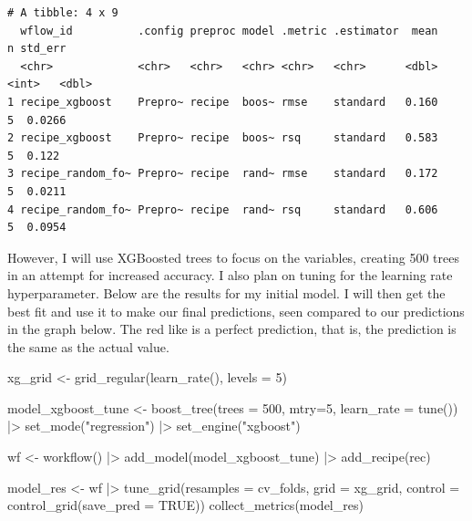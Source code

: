 \documentclass[
  letterpaper,
  DIV=11,
  numbers=noendperiod]{scrartcl}
\newenvironment{Shaded}{\begin{snugshade}}{\end{snugshade}}
\newcommand{\AttributeTok}[1]{\textcolor[rgb]{0.40,0.45,0.13}{#1}}
\newcommand{\ConstantTok}[1]{\textcolor[rgb]{0.56,0.35,0.01}{#1}}
\newcommand{\DecValTok}[1]{\textcolor[rgb]{0.68,0.00,0.00}{#1}}
\newcommand{\FunctionTok}[1]{\textcolor[rgb]{0.28,0.35,0.67}{#1}}
\newcommand{\NormalTok}[1]{\textcolor[rgb]{0.00,0.23,0.31}{#1}}
\newcommand{\OtherTok}[1]{\textcolor[rgb]{0.00,0.23,0.31}{#1}}
\newcommand{\SpecialCharTok}[1]{\textcolor[rgb]{0.37,0.37,0.37}{#1}}
\newcommand{\StringTok}[1]{\textcolor[rgb]{0.13,0.47,0.30}{#1}}
\begin{document}
\begin{verbatim}
# A tibble: 4 x 9
  wflow_id          .config preproc model .metric .estimator  mean     n std_err
  <chr>             <chr>   <chr>   <chr> <chr>   <chr>      <dbl> <int>   <dbl>
1 recipe_xgboost    Prepro~ recipe  boos~ rmse    standard   0.160     5  0.0266
2 recipe_xgboost    Prepro~ recipe  boos~ rsq     standard   0.583     5  0.122 
3 recipe_random_fo~ Prepro~ recipe  rand~ rmse    standard   0.172     5  0.0211
4 recipe_random_fo~ Prepro~ recipe  rand~ rsq     standard   0.606     5  0.0954
\end{verbatim}

However, I will use XGBoosted trees to focus on the variables, creating
500 trees in an attempt for increased accuracy. I also plan on tuning
for the learning rate hyperparameter. Below are the results for my
initial model. I will then get the best fit and use it to make our final
predictions, seen compared to our predictions in the graph below. The
red like is a perfect prediction, that is, the prediction is the same as
the actual value.

\begin{Shaded}
\begin{Highlighting}[]
\NormalTok{xg\_grid }\OtherTok{\textless{}{-}} \FunctionTok{grid\_regular}\NormalTok{(}\FunctionTok{learn\_rate}\NormalTok{(), }\AttributeTok{levels =} \DecValTok{5}\NormalTok{)}

\NormalTok{model\_xgboost\_tune }\OtherTok{\textless{}{-}} \FunctionTok{boost\_tree}\NormalTok{(}\AttributeTok{trees =} \DecValTok{500}\NormalTok{, }\AttributeTok{mtry=}\DecValTok{5}\NormalTok{, }\AttributeTok{learn\_rate =} \FunctionTok{tune}\NormalTok{()) }\SpecialCharTok{|\textgreater{}} 
  \FunctionTok{set\_mode}\NormalTok{(}\StringTok{"regression"}\NormalTok{) }\SpecialCharTok{|\textgreater{}} 
  \FunctionTok{set\_engine}\NormalTok{(}\StringTok{"xgboost"}\NormalTok{)}

\NormalTok{wf }\OtherTok{\textless{}{-}} \FunctionTok{workflow}\NormalTok{() }\SpecialCharTok{|\textgreater{}}
  \FunctionTok{add\_model}\NormalTok{(model\_xgboost\_tune) }\SpecialCharTok{|\textgreater{}}
  \FunctionTok{add\_recipe}\NormalTok{(rec)}

\NormalTok{model\_res }\OtherTok{\textless{}{-}}\NormalTok{ wf }\SpecialCharTok{|\textgreater{}}
  \FunctionTok{tune\_grid}\NormalTok{(}\AttributeTok{resamples =}\NormalTok{ cv\_folds,}
            \AttributeTok{grid =}\NormalTok{ xg\_grid,}
            \AttributeTok{control =} \FunctionTok{control\_grid}\NormalTok{(}\AttributeTok{save\_pred =} \ConstantTok{TRUE}\NormalTok{))}
\FunctionTok{collect\_metrics}\NormalTok{(model\_res)}
\end{Highlighting}
\end{Shaded}
\end{document}
